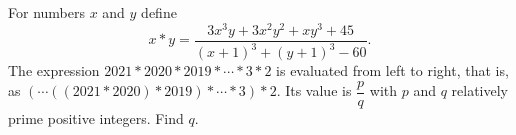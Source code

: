 For numbers $x$ and $y$ define
\[x*y=\dfrac{3x^3y+3x^2y^2+xy^3+45}{(x+1)^3+(y+1)^3-60}.\]
The expression $2021*2020*2019*\cdots*3*2$ is evaluated from left to right, that is, as $\left(\cdots\left((2021*2020)*2019\right)*\cdots*3\right)*2$. Its value is $\dfrac pq$ with $p$ and $q$ relatively prime positive integers. Find $q$.
